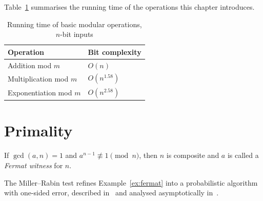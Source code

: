 \documentclass[a4paper]{book}
\begin{document}
Table~\ref{tab:complexity} summarises the running time of the operations
this chapter introduces.

\begin{table}[htbp]
\centering
\caption{Running time of basic modular operations, $n$-bit inputs}
\label{tab:complexity}
\begin{tabular}{l l}
\toprule
Operation & Bit complexity \\
\midrule
Addition mod $m$       & $O(n)$ \\
Multiplication mod $m$ & $O(n^{1.58})$ \\
Exponentiation mod $m$ & $O(n^{2.58})$ \\
\bottomrule
\end{tabular}
\end{table}

\chapter{Primality}
\label{ch:primality}

\begin{example}
\label{ex:fermat}
If $\gcd(a, n) = 1$ and $a^{n-1} \not\equiv 1 \pmod{n}$, then $n$ is
composite and $a$ is called a \emph{Fermat witness} for $n$.
\end{example}

The Miller--Rabin test refines Example~\ref{ex:fermat} into a
probabilistic algorithm with one-sided error, described
in~\citet{cormen2009algorithms} and analysed asymptotically
in~\citet{knuth1997art}.

\backmatter



\end{document}
